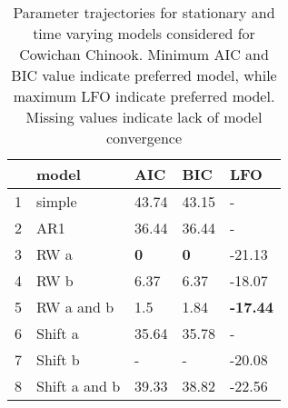 \begin{table}[ht]
\centering
\caption{Parameter trajectories for stationary 
  and time varying models considered for Cowichan Chinook. Minimum 
  AIC and BIC value indicate preferred model, while maximum LFO indicate 
  preferred model. Missing values indicate lack of model convergence} 
\label{cowcrit}
\begin{tabular}{rllll}
  \hline
 & model & AIC & BIC & LFO \\ 
  \hline
1 & simple & 43.74 & 43.15 & - \\ 
  2 & AR1 & 36.44 & 36.44 & - \\ 
  3 & RW a & \textbf{0} & \textbf{0} & -21.13 \\ 
  4 & RW b & 6.37 & 6.37 & -18.07 \\ 
  5 & RW a and b & 1.5 & 1.84 & \textbf{-17.44} \\ 
  6 & Shift a & 35.64 & 35.78 & - \\ 
  7 & Shift b & - & - & -20.08 \\ 
  8 & Shift a and b & 39.33 & 38.82 & -22.56 \\ 
   \hline
\end{tabular}
\end{table}
